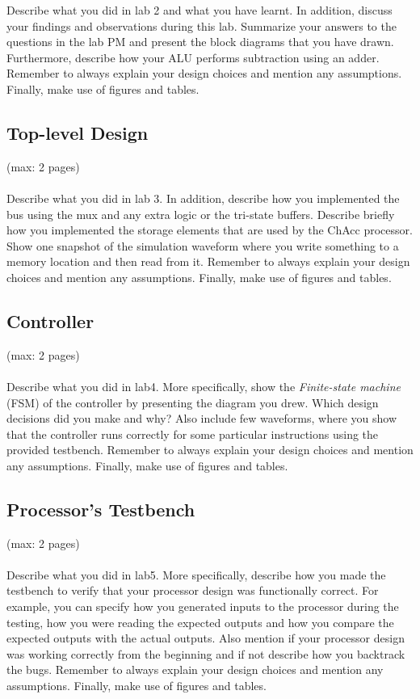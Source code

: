 \documentclass[a4paper,11pt]{article}
\begin{document}
Describe what you did in lab 2 and what you have learnt. In addition, discuss your findings and observations during this lab. Summarize your answers to the questions in the lab PM and present the block diagrams that you have drawn. Furthermore, describe how your ALU performs subtraction using an adder. Remember to always explain your design choices and mention any assumptions. Finally, make use of figures and tables. 

\subsection{Top-level Design}
(max: 2 pages)
\\\\
Describe what you did in lab 3. In addition, describe how you implemented the bus using the mux and any extra logic or the tri-state buffers. Describe briefly how you implemented the storage elements that are used by the ChAcc processor. Show one snapshot of the simulation waveform where you write something to a memory location and then read from it. Remember to always explain your design choices and mention any assumptions. Finally, make use of figures and tables. 

\subsection{Controller}
(max: 2 pages)
\\\\
Describe what you did in lab4. More specifically, show the \emph{Finite-state machine} (FSM) of the controller by presenting the diagram you drew. Which design decisions did you make and why? Also include few waveforms, where you show that the controller runs correctly for some particular instructions using the provided testbench. Remember to always explain your design choices and mention any assumptions. Finally, make use of figures and tables. 

\subsection{Processor's Testbench}
(max: 2 pages)
\\\\
Describe what you did in lab5. More specifically, describe how you made the testbench to verify that your processor design was functionally correct. For example, you can specify how you generated inputs to the processor during the testing, how you were reading the expected outputs and how you compare the expected outputs with the actual outputs. Also mention if your processor design was working correctly from the beginning and if not describe how you backtrack the bugs. Remember to always explain your design choices and mention any assumptions. Finally, make use of figures and tables. 
\end{document}
